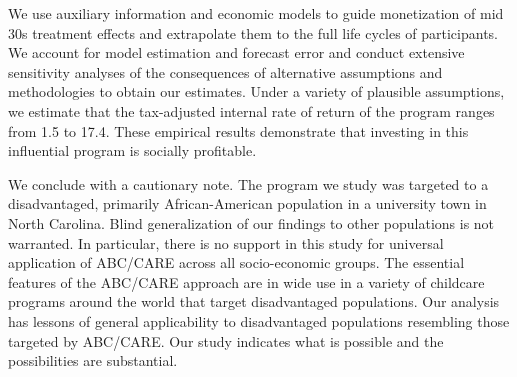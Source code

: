 We use auxiliary information and economic models to guide monetization of mid 30s treatment effects and extrapolate them to the full life cycles of participants. We account for model estimation and forecast error and conduct extensive sensitivity analyses of the consequences of alternative assumptions and methodologies to obtain our estimates. Under a variety of plausible assumptions, we estimate that the tax-adjusted internal rate of return of the program ranges from 1.5 to 17.4. These empirical results demonstrate that investing in this influential program is socially profitable.

We conclude with a cautionary note. The program we study was targeted to a disadvantaged, primarily African-American population in a university town in North Carolina. Blind generalization of our findings to other populations is not warranted. In particular, there is no support in this study for universal application of ABC/CARE across all socio-economic groups. The essential features of the ABC/CARE approach are in wide use in a variety of childcare programs around the world that target disadvantaged populations. Our analysis has lessons of general applicability to disadvantaged populations resembling those targeted by ABC/CARE. Our study indicates what is possible and the possibilities are substantial.

\singlespace






